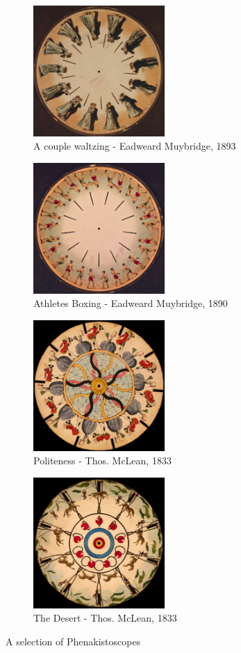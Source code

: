 %
\begin{figure}
	\centering
	\begin{subfigure}[t]{5cm}
		\centering
		\includegraphics[width=5cm]{images/12}
		\caption{A couple waltzing - Eadweard Muybridge, 1893}
		\label{fig:gqrx_spectrogram_01} 
	\end{subfigure}
	\quad
	\begin{subfigure}[t]{5cm}
		\centering
		\includegraphics[width=5cm]{images/13}
		\caption{Athletes Boxing - Eadweard Muybridge, 1890}
		\label{fig:rtl_power_spectrogram_01} 
	\end{subfigure}
	\quad
	\begin{subfigure}[t]{5cm}
		\centering
		\includegraphics[width=5cm]{images/14}
		\caption{Politeness - Thos. McLean, 1833}
		\label{fig:rtl_power_spectrogram_02} 
	\end{subfigure}
	\quad
	\begin{subfigure}[t]{5cm}
		\centering
		\includegraphics[width=5cm]{images/15}
		\caption{The Desert - Thos. McLean, 1833}
		\label{fig:rtl_power_spectrogram_03} 
	\end{subfigure}
	\quad
	\caption{A selection of Phenakistoscopes}
	\label{fig:phenakistoscopes}
\end{figure}
%


